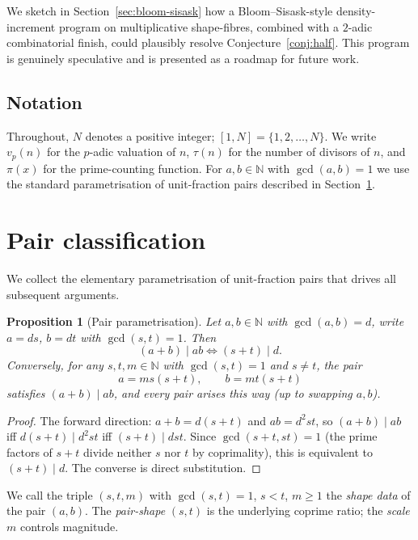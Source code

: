 \documentclass[11pt]{amsart}
\theoremstyle{plain}
\newtheorem{proposition}[theorem]{Proposition}
\theoremstyle{definition}
\newcommand{\N}{\mathbb{N}}
\begin{document}
We sketch in Section~\ref{sec:bloom-sisask} how a Bloom--Sisask-style density-increment program \cite{BloomSisask2020, BloomSisask2019} on multiplicative shape-fibres, combined with a $2$-adic combinatorial finish, could plausibly resolve Conjecture~\ref{conj:half}. This program is genuinely speculative and is presented as a roadmap for future work.

\subsection{Notation}

Throughout, $N$ denotes a positive integer; $[1, N] = \{1, 2, \ldots, N\}$. We write $v_p(n)$ for the $p$-adic valuation of $n$, $\tau(n)$ for the number of divisors of $n$, and $\pi(x)$ for the prime-counting function. For $a, b \in \N$ with $\gcd(a, b) = 1$ we use the standard parametrisation of unit-fraction pairs described in Section~\ref{sec:classification}.

\section{Pair classification}\label{sec:classification}

We collect the elementary parametrisation of unit-fraction pairs that drives all subsequent arguments.

\begin{proposition}[Pair parametrisation]\label{prop:classification}
Let $a, b \in \N$ with $\gcd(a, b) = d$, write $a = ds$, $b = dt$ with $\gcd(s, t) = 1$. Then
\[
  (a + b) \mid ab \iff (s + t) \mid d.
\]
Conversely, for any $s, t, m \in \N$ with $\gcd(s, t) = 1$ and $s \neq t$, the pair
\[
  a = m s (s + t), \qquad b = m t (s + t)
\]
satisfies $(a + b) \mid ab$, and every pair arises this way (up to swapping $a, b$).
\end{proposition}

\begin{proof}
The forward direction: $a + b = d(s + t)$ and $ab = d^2 st$, so $(a+b) \mid ab$ iff $d(s+t) \mid d^2 st$ iff $(s+t) \mid dst$. Since $\gcd(s+t, st) = 1$ (the prime factors of $s + t$ divide neither $s$ nor $t$ by coprimality), this is equivalent to $(s+t) \mid d$. The converse is direct substitution.
\end{proof}

We call the triple $(s, t, m)$ with $\gcd(s, t) = 1$, $s < t$, $m \geq 1$ the \emph{shape data} of the pair $(a, b)$. The \emph{pair-shape} $(s, t)$ is the underlying coprime ratio; the \emph{scale} $m$ controls magnitude.
\end{document}
